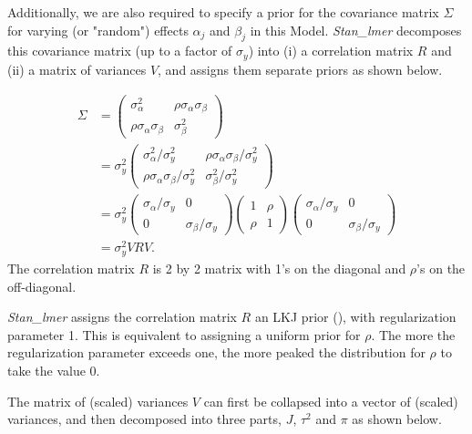 Additionally, we are also required to specify a prior for the covariance matrix $\Sigma$ for varying (or "random") effects $\alpha_j$ and $\beta_j$ in this Model.  \textit{Stan\_lmer} decomposes this covariance matrix (up to a factor of $\sigma_y$) into (i) a correlation matrix $R$ and (ii) a matrix of variances $V$, and assigns them separate priors as shown below. 


\begin{align}
	\Sigma &=
	\left(\begin{matrix}
		\sigma_\alpha^2 & \rho\sigma_\alpha \sigma_\beta \\
		\rho\sigma_\alpha\sigma_\beta&\sigma_\beta^2
	\end{matrix} \right)\\ &=
	\sigma_y^2\left(\begin{matrix}
		\sigma_\alpha^2/\sigma_y^2 & \rho\sigma_\alpha \sigma_\beta/\sigma_y^2 \\
		\rho\sigma_\alpha\sigma_\beta/\sigma_y^2 & \sigma_\beta^2/\sigma_y^2
	\end{matrix} \right)\\ &=
	\sigma_y^2\left(\begin{matrix}
		\sigma_\alpha/\sigma_y & 0 \\
		0&\sigma_\beta/\sigma_y
	\end{matrix} \right)
	\left(\begin{matrix}
		1 & \rho\\
		\rho&1
	\end{matrix} \right)
	\left(\begin{matrix}
		\sigma_\alpha/\sigma_y & 0 \\
		0&\sigma_\beta/\sigma_y
	\end{matrix} \right)\\
	&= \sigma_y^2VRV.
\end{align}
The correlation matrix $R$ is 2 by 2 matrix with 1's on the diagonal and $\rho$'s on the off-diagonal. 

\textit{Stan\_lmer} assigns the correlation matrix $R$ an LKJ prior (\cite{lewandowski2009generating}), with regularization parameter 1.  This is equivalent to assigning a uniform prior for $\rho$.  The more the regularization parameter exceeds one, the more peaked the distribution for $\rho$ to take the value 0.

The matrix of (scaled) variances $V$ can first be collapsed into a vector of (scaled) variances, and then decomposed into three parts, $J$, $\tau^2$ and $\pi$ as shown below.

